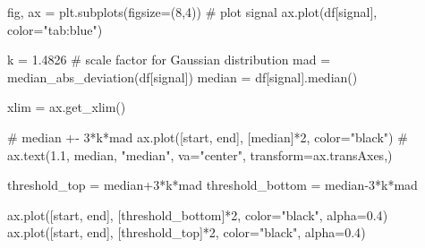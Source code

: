 \documentclass[
  letterpaper,
  DIV=11,
  numbers=noendperiod,
  oneside]{scrreprt}
\newenvironment{Shaded}{\begin{snugshade}}{\end{snugshade}}
\newcommand{\CommentTok}[1]{\textcolor[rgb]{0.37,0.37,0.37}{#1}}
\newcommand{\DecValTok}[1]{\textcolor[rgb]{0.68,0.00,0.00}{#1}}
\newcommand{\FloatTok}[1]{\textcolor[rgb]{0.68,0.00,0.00}{#1}}
\newcommand{\NormalTok}[1]{\textcolor[rgb]{0.00,0.23,0.31}{#1}}
\newcommand{\OperatorTok}[1]{\textcolor[rgb]{0.37,0.37,0.37}{#1}}
\newcommand{\StringTok}[1]{\textcolor[rgb]{0.13,0.47,0.30}{#1}}
\begin{document}
\begin{Shaded}
\begin{Highlighting}[]
\NormalTok{fig, ax }\OperatorTok{=}\NormalTok{ plt.subplots(figsize}\OperatorTok{=}\NormalTok{(}\DecValTok{8}\NormalTok{,}\DecValTok{4}\NormalTok{))}
\CommentTok{\# plot signal}
\NormalTok{ax.plot(df[}\StringTok{\textquotesingle{}signal\textquotesingle{}}\NormalTok{], color}\OperatorTok{=}\StringTok{"tab:blue"}\NormalTok{)}

\NormalTok{k }\OperatorTok{=} \FloatTok{1.4826} \CommentTok{\# scale factor for Gaussian distribution}
\NormalTok{mad }\OperatorTok{=}\NormalTok{ median\_abs\_deviation(df[}\StringTok{\textquotesingle{}signal\textquotesingle{}}\NormalTok{])}
\NormalTok{median }\OperatorTok{=}\NormalTok{ df[}\StringTok{\textquotesingle{}signal\textquotesingle{}}\NormalTok{].median()}

\NormalTok{xlim }\OperatorTok{=}\NormalTok{ ax.get\_xlim()}

\CommentTok{\# median +{-} 3*k*mad}
\NormalTok{ax.plot([start, end], [median]}\OperatorTok{*}\DecValTok{2}\NormalTok{, color}\OperatorTok{=}\StringTok{"black"}\NormalTok{)}
\CommentTok{\# ax.text(1.1, median, "median", va="center", transform=ax.transAxes,)}

\NormalTok{threshold\_top }\OperatorTok{=}\NormalTok{ median}\OperatorTok{+}\DecValTok{3}\OperatorTok{*}\NormalTok{k}\OperatorTok{*}\NormalTok{mad}
\NormalTok{threshold\_bottom }\OperatorTok{=}\NormalTok{ median}\OperatorTok{{-}}\DecValTok{3}\OperatorTok{*}\NormalTok{k}\OperatorTok{*}\NormalTok{mad}

\NormalTok{ax.plot([start, end], [threshold\_bottom]}\OperatorTok{*}\DecValTok{2}\NormalTok{, color}\OperatorTok{=}\StringTok{"black"}\NormalTok{, alpha}\OperatorTok{=}\FloatTok{0.4}\NormalTok{)}
\NormalTok{ax.plot([start, end], [threshold\_top]}\OperatorTok{*}\DecValTok{2}\NormalTok{, color}\OperatorTok{=}\StringTok{"black"}\NormalTok{, alpha}\OperatorTok{=}\FloatTok{0.4}\NormalTok{)}


\end{Highlighting}
\end{Shaded}
\end{document}
